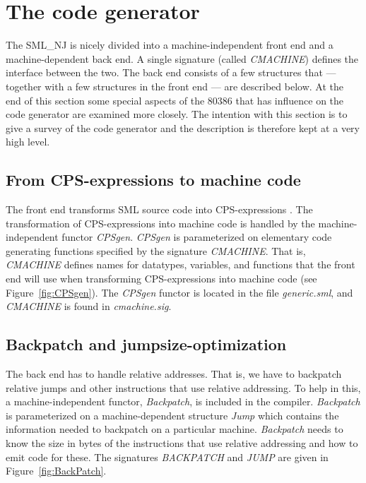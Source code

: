\section{The code generator}

The SML\_NJ is nicely divided into a machine-independent front end and
a machine-dependent back end. A single signature (called {\em
CMACHINE\/}) defines the interface between the two. The back end
consists of a few structures that --- together with a few structures
in the front end --- are described below. At the end of this section
some special aspects of the 80386 that has influence on the code
generator are examined more closely.  The intention with this section
is to give a survey of the code generator and the description is
therefore kept at a very high level.

\subsection{From CPS-expressions to machine code} \label{sec:CPStoMach}

The front end transforms SML source code into CPS-expressions
\cite{bib:ContClos,bib:ysgsml,bib:orbit,bib:rabbit}. The
transformation of CPS-expressions into machine code is handled by the
machine-independent functor {\em CPSgen\/}. {\em CPSgen\/} is
parameterized on elementary code generating functions specified by the
signature {\em CMACHINE\/}. That is, {\em CMACHINE\/} defines names
for datatypes, variables, and functions that the front end will use
when transforming CPS-expressions into machine code (see
Figure~\ref{fig:CPSgen}).
 The {\em CPSgen\/} functor is located in the file
{\em generic.sml\/}, and {\em CMACHINE\/} is found in {\em
cmachine.sig\/}.

\subsection{Backpatch and jumpsize-optimization}

The back end has to handle relative addresses. That is, we have to
backpatch relative jumps and other instructions that use relative
addressing. To help in this, a machine-independent functor, {\em
Backpatch\/}, is included in the compiler. {\em Backpatch\/} is
parameterized on a machine-dependent structure {\em Jump\/} which
contains the information needed to backpatch on a particular machine.
{\em Backpatch} needs to know the size in bytes of the
instructions that use relative addressing and how to emit code for
these. The signatures {\em BACKPATCH\/} and {\em JUMP\/} are given
in Figure~\ref{fig:BackPatch}.   

